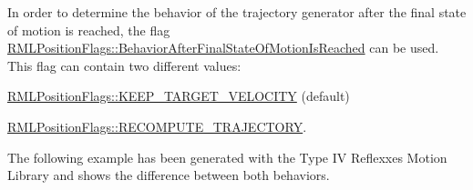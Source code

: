 In order to determine the behavior of the trajectory generator after the final state of motion is reached, the flag {\ttfamily \mbox{\hyperlink{classRMLPositionFlags_a85a2739dcace743bf56c81946036d504}{R\+M\+L\+Position\+Flags\+::\+Behavior\+After\+Final\+State\+Of\+Motion\+Is\+Reached}}} can be used. This flag can contain two different values\+:


\begin{DoxyEnumerate}
\item {\ttfamily \mbox{\hyperlink{classRMLPositionFlags_a0cf5bb7ba9fb4d9ab8040b0546170761a4c0ff3d692225145faf8ff420a181a6f}{R\+M\+L\+Position\+Flags\+::\+K\+E\+E\+P\+\_\+\+T\+A\+R\+G\+E\+T\+\_\+\+V\+E\+L\+O\+C\+I\+TY}}} (default)
\item {\ttfamily \mbox{\hyperlink{classRMLPositionFlags_a0cf5bb7ba9fb4d9ab8040b0546170761a1aef826d31747b8d4e1f89c024fb36ae}{R\+M\+L\+Position\+Flags\+::\+R\+E\+C\+O\+M\+P\+U\+T\+E\+\_\+\+T\+R\+A\+J\+E\+C\+T\+O\+RY}}}.
\end{DoxyEnumerate}

The following example has been generated with the Type IV Reflexxes Motion Library and shows the difference between both behaviors.

~\newline
~\newline
 

~\newline
 

